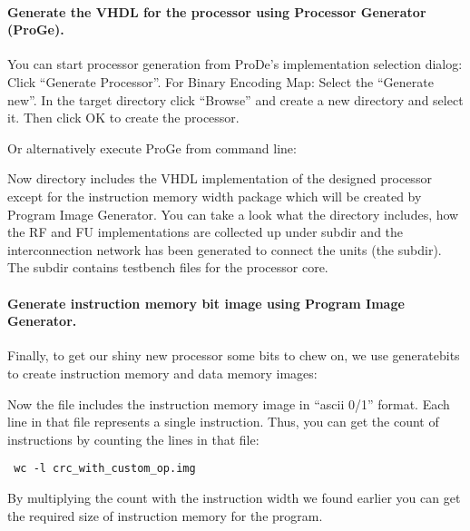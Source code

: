 \documentclass[twoside]{tceusermanual}
\begin{document}
\paragraph{Generate the VHDL for the processor using Processor Generator
(ProGe).} 

You can start processor generation from ProDe's implementation selection dialog:
Click ``Generate Processor''. For Binary Encoding Map: Select the
``Generate new''. In the target directory click ``Browse'' and create a new
directory  and select it. Then click OK to create the
processor.

Or alternatively execute ProGe from command line:


Now directory  includes the VHDL implementation of the
designed processor except for the instruction memory width package which will
be created by Program Image Generator. You can take a look what the directory
includes, how the RF and FU implementations are collected up under
 subdir and the interconnection network has been generated to
connect the units (the  subdir). The  subdir contains
testbench files for the processor core.

\paragraph{Generate instruction memory bit image using Program Image Generator.}

Finally, to get our shiny new processor some bits to chew on,
we use generatebits to create instruction memory and data memory images:


Now the file  includes the instruction memory
image in ``ascii 0/1'' format. Each line in that file represents a single
instruction. Thus, you can get the count of instructions by counting the
lines in that file:

\begin{verbatim}
 wc -l crc_with_custom_op.img
\end{verbatim}

By multiplying the count with the instruction width we found earlier you
can get the required size of instruction memory for the program.
\end{document}
